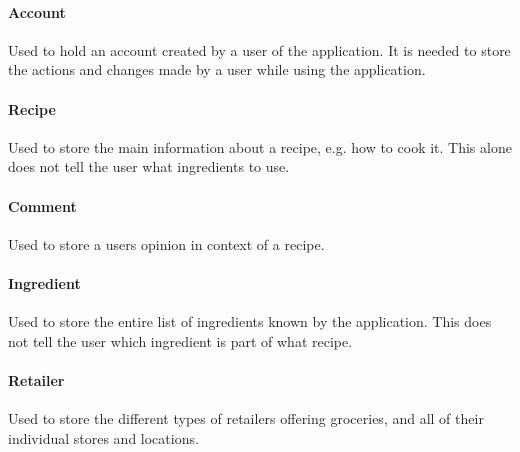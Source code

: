 \paragraph{Account} Used to hold an account created by a user of the application. It is needed to store the actions and changes made by a user while using the application. 

\paragraph{Recipe} Used to store the main information about a recipe, e.g. how to cook it. This alone does not tell the user what ingredients to use.

\paragraph{Comment} Used to store a users opinion in context of a recipe.

\paragraph{Ingredient} Used to store the entire list of ingredients known by the application. This does not tell the user which ingredient is part of what recipe.

\paragraph{Retailer} Used to store the different types of retailers offering groceries, and all of their individual stores and locations.
\newline

